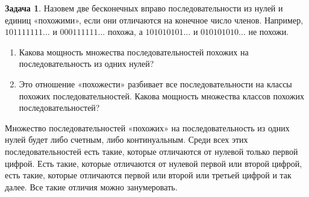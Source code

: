 \documentclass[pdftex, 12pt, a4paper]{article}
\theoremstyle{definition} %
\newtheorem{problem}{Задача}
\numberwithin{problem}{section}
\numberwithin{blits}{section}
\begin{document}
\begin{problem}
Назовем две бесконечных вправо последовательности из нулей и единиц «похожими», если они отличаются на конечное число членов. Например, $101111111 \ldots$ и $000111111 \ldots$ похожа, а $101010101 \ldots$ и $010101010 \ldots$ не похожи.
\begin{enumerate}
\item Какова мощность множества последовательностей похожих на последовательность из одних нулей?
\item Это отношение «похожести» разбивает все последовательности на классы похожих последовательностей. Какова мощность множества классов похожих последовательностей?
\end{enumerate}
\begin{sol}
Множество последовательностей «похожих» на последовательность из одних нулей будет либо счетным, либо континуальным. Среди всех этих последовательностей есть такие, которые отличаются от нулевой только первой цифрой. Есть такие, которые отличаются от нулевой первой или второй цифрой, есть такие, которые отличаются первой или второй или третьей цифрой и так далее. Все такие отличия можно занумеровать.


\end{sol}
\end{problem}
\end{document}

